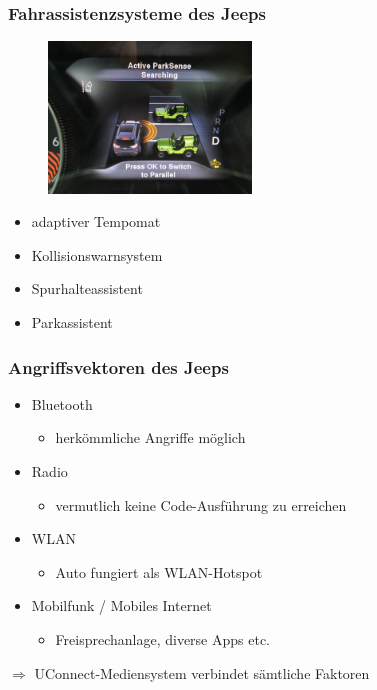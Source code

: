 \documentclass[t]{beamer}
\begin{document}
\begin{frame}
    \frametitle{Fahrassistenzsysteme des Jeeps}
    \begin{figure}
        \includegraphics[width=0.48\textwidth]{pic/jeep_parkass.png}
        \caption{}
    \end{figure}
    \begin{itemize}
        \item adaptiver Tempomat
        \item Kollisionswarnsystem
        \item Spurhalteassistent
        \item Parkassistent
    \end{itemize}
\end{frame}

\begin{frame}
	\frametitle{Angriffsvektoren des Jeeps}
    \begin{itemize}
		\item Bluetooth
        \begin{itemize}
			\item herkömmliche Angriffe möglich
		\end{itemize}

    	\item Radio
        	\begin{itemize}
				\item vermutlich keine Code-Ausführung zu erreichen
			\end{itemize}

        \item WLAN
        	\begin{itemize}
				\item Auto fungiert als WLAN-Hotspot
			\end{itemize}

        \item Mobilfunk / Mobiles Internet
       		\begin{itemize}
				\item Freisprechanlage, diverse Apps etc.
			\end{itemize}
	\end{itemize}
    $\Rightarrow$ UConnect-Mediensystem verbindet sämtliche Faktoren
\end{frame}
\end{document}
